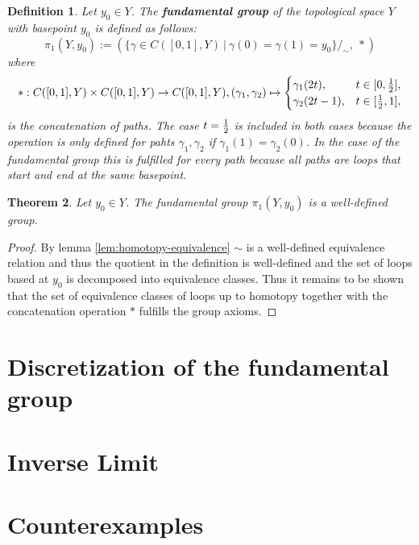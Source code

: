 \documentclass{article}
\theoremstyle{break}
\newtheorem{thm}{Theorem}[section]
\theoremstyle{break}
\newtheorem{defin}[thm]{Definition}
\begin{document}
\begin{defin}
  Let $y_0 \in Y$. The \textbf{fundamental group} of the topological space $Y$ with basepoint $y_0$ is defined as follows:
  \begin{equation*}
    \pi_1(Y, y_0) := (\{\gamma \in C([0,1],Y) \: | \: \gamma(0) = \gamma(1) = y_0\}/_{\sim}, \: *)
  \end{equation*}
  where 
  \begin{equation*} 
    *: C([0,1], Y) \times C([0,1], Y) \to C([0,1], Y), (\gamma_1, \gamma_2) \mapsto \begin{cases}
    \gamma_1(2t),   &t \in [0, {1 \over 2}], \\
    \gamma_2(2t-1), &t \in [{1 \over 2}, 1],
  \end{cases}
\end{equation*}
is the concatenation of paths. The case $t = {1\over2}$ is included in both cases because the operation is only defined for pahts $\gamma_1, \gamma_2$ if $\gamma_1(1) = \gamma_2(0)$. 
In the case of the fundamental group this is fulfilled for every path because all paths are loops that start and end at the same basepoint. 
\end{defin}

\begin{thm}
  Let $y_0 \in Y$. The fundamental group $\pi_1(Y, y_0)$ is a well-defined group. 
\end{thm}

\begin{proof}
  By lemma \ref{lem:homotopy-equivalence} $\sim$ is a well-defined equivalence relation and thus the quotient in the definition is well-defined and the set of loops based at $y_0$ is decomposed into equivalence classes.
  Thus it remains to be shown that the set of equivalence classes of loops up to homotopy together with the concatenation operation $*$ fulfills the group axioms.
\end{proof}

\section{Discretization of the fundamental group}

\section{Inverse Limit}

\section{Counterexamples}

\clearpage

\end{document}
